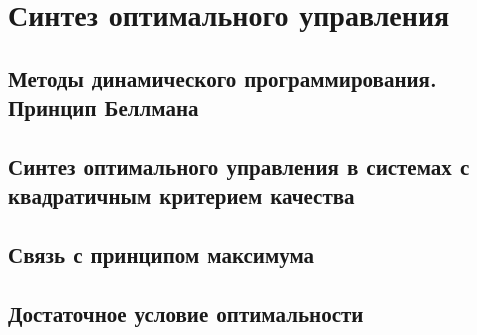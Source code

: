 \chapter{Синтез оптимального управления}



\section{Методы динамического программирования. Принцип Беллмана}



\section{Синтез оптимального управления в системах с квадратичным критерием качества}



\section{Связь с принципом максимума}



\section{Достаточное условие оптимальности}
